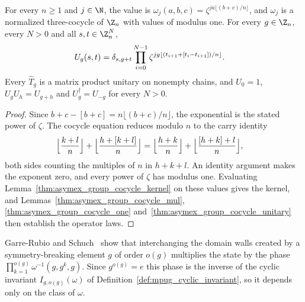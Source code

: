 \begin{lemma}
    \label{thm:asymex_group_cocycle_cyclic}
    \leanok
    For every $n\geq1$ and $j\in\N$, the value is
    $\omega_j(a,b,c)=\zeta^{ja\lfloor(b+c)/n\rfloor}$, and $\omega_j$ is a
    normalized three-cocycle of $\Z_n$ with values of modulus one. For every
    $g\in\Z_n$, every $N>0$ and all $s,t\in\Z_n^N$,
    \begin{align}
        U_g(s,t)
         & =\delta_{s,g+t}\prod_{i=0}^{N-1}
        \zeta^{jg\lfloor(t_{i+1}+[t_i-t_{i+1}])/n\rfloor}.
        \notag
    \end{align}
    Every $\hat T_g$ is a matrix product unitary on nonempty chains, and
    $U_0=1$, $U_gU_h=U_{g+h}$ and $U_g^\dagger=U_{-g}$ for every $N>0$.
\end{lemma}

\begin{proof}
    \leanok
    Since $b+c-[b+c]=n\lfloor(b+c)/n\rfloor$, the exponential is the stated
    power of $\zeta$. The cocycle equation reduces modulo $n$ to the carry
    identity
    \begin{align}
        \Bigl\lfloor\frac{k+l}{n}\Bigr\rfloor
        +\Bigl\lfloor\frac{h+[k+l]}{n}\Bigr\rfloor
         & =\Bigl\lfloor\frac{h+k}{n}\Bigr\rfloor
        +\Bigl\lfloor\frac{[h+k]+l}{n}\Bigr\rfloor,
        \notag
    \end{align}
    both sides counting the multiples of $n$ in $h+k+l$. An identity
    argument makes the exponent zero, and every power of $\zeta$ has
    modulus one. Evaluating
    Lemma~\ref{thm:asymex_group_cocycle_kernel} on these values gives the
    kernel, and Lemmas~\ref{thm:asymex_group_cocycle_mul},
    \ref{thm:asymex_group_cocycle_one}
    and~\ref{thm:asymex_group_cocycle_unitary} then establish the operator
    laws.
\end{proof}

Garre-Rubio and Schuch~\cite[Section~IV.C]{GarreRubioSchuch2024DomainWall}
show that interchanging the domain walls created by a symmetry-breaking
element $g$ of order $o(g)$ multiplies the state by the phase
$\prod_{k=1}^{o(g)}\omega^{-1}(g,g^k,g)$. Since $g^{o(g)}=e$ this phase is
the inverse of the cyclic invariant $I_{g,o(g)}(\omega)$ of
Definition~\ref{def:mpug_cyclic_invariant}, so it depends only on the
class of $\omega$.


